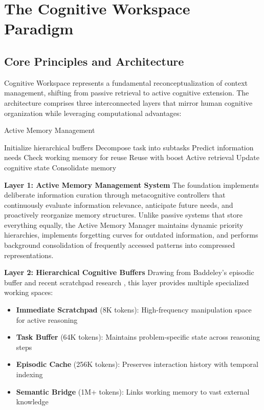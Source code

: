 \documentclass[10pt,twocolumn]{article}
\begin{document}
\section{The Cognitive Workspace Paradigm}

\subsection{Core Principles and Architecture}

Cognitive Workspace represents a fundamental reconceptualization of context management, shifting from passive retrieval to active cognitive extension. The architecture comprises three interconnected layers that mirror human cognitive organization while leveraging computational advantages:

\begin{algorithm}
\caption{Active Memory Management}
\begin{algorithmic}[1]
\STATE Initialize hierarchical buffers
  \STATE Decompose task into subtasks
  \STATE Predict information needs
  \STATE Check working memory for reuse
    \STATE Reuse with boost
  \ELSE
    \STATE Active retrieval
  \ENDIF
  \STATE Update cognitive state
  \STATE Consolidate memory
\ENDWHILE
\end{algorithmic}
\end{algorithm}

\textbf{Layer 1: Active Memory Management System}
The foundation implements deliberate information curation through metacognitive controllers that continuously evaluate information relevance, anticipate future needs, and proactively reorganize memory structures. Unlike passive systems that store everything equally, the Active Memory Manager maintains dynamic priority hierarchies, implements forgetting curves for outdated information, and performs background consolidation of frequently accessed patterns into compressed representations.

\textbf{Layer 2: Hierarchical Cognitive Buffers}
Drawing from Baddeley's episodic buffer \cite{baddeley2000episodic} and recent scratchpad research \cite{nye2021show}, this layer provides multiple specialized working spaces:
\begin{itemize}
\item \textbf{Immediate Scratchpad} (8K tokens): High-frequency manipulation space for active reasoning
\item \textbf{Task Buffer} (64K tokens): Maintains problem-specific state across reasoning steps
\item \textbf{Episodic Cache} (256K tokens): Preserves interaction history with temporal indexing
\item \textbf{Semantic Bridge} (1M+ tokens): Links working memory to vast external knowledge
\end{itemize}
\end{document}
